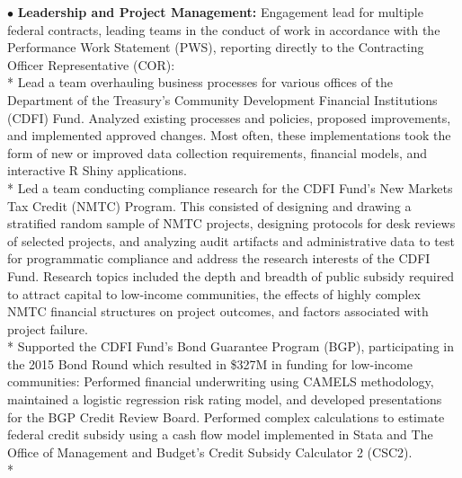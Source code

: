 \documentclass{article}
\begin{document}
$\bullet$ \textbf{Leadership and Project Management:} Engagement lead for multiple federal contracts, leading teams in the conduct of work in accordance with the Performance Work Statement (PWS), reporting directly to the Contracting Officer Representative (COR): \\*
\indent \textendash Lead a team overhauling business processes for various offices of the Department of the Treasury's Community Development Financial Institutions (CDFI) Fund. Analyzed existing processes and policies, proposed improvements, and implemented approved changes. Most often, these implementations took the form of new or improved data collection requirements, financial models, and interactive R Shiny applications.\\*
\indent \textendash Led a team conducting compliance research for the CDFI Fund’s New Markets Tax Credit (NMTC) Program. This consisted of designing and drawing a stratified random sample of NMTC projects, designing protocols for desk reviews of selected projects, and analyzing audit artifacts and administrative data to test for programmatic compliance and address the research interests of the CDFI Fund. Research topics included the depth and breadth of public subsidy required to attract capital to low-income communities, the effects of highly complex NMTC financial structures on project outcomes, and factors associated with project failure. \\*
\indent \textendash Supported the CDFI Fund’s Bond Guarantee Program (BGP), participating in the 2015 Bond Round which resulted in \$327M in funding for low-income communities: Performed financial underwriting using CAMELS methodology, maintained a logistic regression risk rating model, and developed presentations for the BGP Credit Review Board. Performed complex calculations to estimate federal credit subsidy using a cash flow model implemented in Stata and The Office of Management and Budget’s Credit Subsidy Calculator 2 (CSC2). \\*
\end{document}
